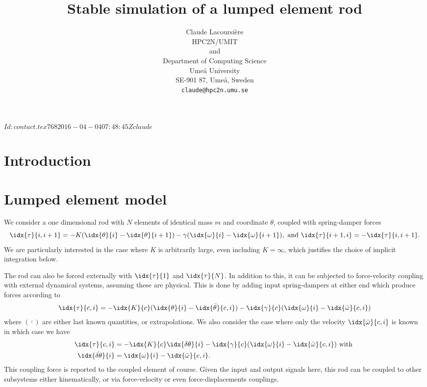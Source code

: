 \documentclass[10pt,notitlepage,abstracton]{scrartcl}
\title{Stable simulation of a lumped element rod}
\author{Claude Lacoursi{\`{e}}re \\
  HPC2N/UMIT \\
  and \\
  Department of Computing Science \\
  Ume{\aa} University\\
  SE-901 87, Ume{\aa}, Sweden\\
  \texttt{claude@hpc2n.umu.se}
}
\theoremstyle{plain}
\theoremstyle{plain}
\theoremstyle{plain}
\begin{document}
\svnInfo $Id: contact.tex 768 2016-04-04 07:48:45Z claude $
\maketitle{}
\svnId
\begin{abstract}

\end{abstract}

\section{Introduction}
\label{sec:introduction}



\section{Lumped element model}
\label{sec:optim-cont-point}

We consider a one dimensional rod with $N$ elements of identical mass $m$
and coordinate $\theta$, coupled with spring-damper forces
\begin{equation}
  \label{eq:1}
  \idx{\tau}{i,i+1} = -K(\idx{\theta}{i}-\idx{\theta}{i+1}) -
  \gamma(\idx{\omega}{i}-\idx{\omega}{i+1}), \text{ and } \idx{\tau}{i+1,i}
  = -
  \idx{\tau}{i,i+1}. 
\end{equation}
We are particularly interested in the case where $K$ is arbitrarily large,
even including $K=\infty$, which justifies the choice of implicit
integration below.

The rod can also be forced externally with $\idx{\tau}{1}$ and $\idx{\tau}{N}$.
In addition to this, it can be subjected to force-velocity coupling with
external dynamical systems, assuming these are physical.  This is done by
adding input spring-dampers at either end which produce forces according to 
\begin{equation}
  \label{eq:2}
  \idx{\tau}{c,i} = 
-\idx{K}{c}(\idx{\theta}{i}- \idx{\bar{\theta}}{c,i})
-\idx{\gamma}{c}(\idx{\omega}{i}- \idx{\bar{\omega}}{c,i})
\end{equation}
where $(\bar{\cdot})$ are either last known quantities, or extrapolations.
We also consider the case where only the velocity $\idx{\bar{\omega}}{c,i}$
is known in which case we have
\begin{equation}
  \label{eq:3}
  \begin{split}
    \idx{\tau}{c,i} &= 
    -\idx{K}{c}\idx{\delta\theta}{i}
    -\idx{\gamma}{c}(\idx{\omega}{i}- \idx{\bar{\omega}}{c,i})\text{ with } \\
    \idx{\dot{\delta\theta}}{i} & =
    \idx{\omega}{i}-\idx{\bar{\omega}}{e,i}. 
  \end{split}
\end{equation}
This coupling force is reported to the coupled element of course.  Given
the input and output signals here, this rod can be coupled to
other subsystems either kinematically, or via force-velocity or even
force-displacements couplings.
\end{document}
